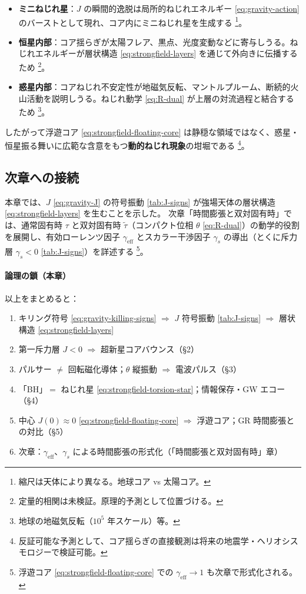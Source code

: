 \documentclass[dvipdfmx,a4paper,oneside]{jsbook}
\numberwithin{equation}{chapter}
\begin{document}
\begin{itemize}[leftmargin=2em]
  \item \textbf{ミニねじれ星}：\(J\) の瞬間的逸脱は局所的ねじれエネルギー \eqref{eq:gravity-action} のバーストとして現れ、コア内にミニねじれ星を生成する \footnote{縮尺は天体により異なる。地球コア vs 太陽コア。}。
  \item \textbf{恒星内部}：コア揺らぎが太陽フレア、黒点、光度変動などに寄与しうる。ねじれエネルギーが層状構造 \eqref{eq:strongfield-layers} を通じて外向きに伝播するため \footnote{定量的相関は未検証。原理的予測として位置づける。}。
  \item \textbf{惑星内部}：コアねじれ不安定性が地磁気反転、マントルプルーム、断続的火山活動を説明しうる。ねじれ動学 \eqref{eq:R-dual} が上層の対流過程と結合するため \footnote{地球の地磁気反転（\(10^5\) 年スケール）等。}。
\end{itemize}

したがって浮遊コア \eqref{eq:strongfield-floating-core} は静穏な領域ではなく、惑星・恒星振る舞いに広範な含意をもつ\textbf{動的ねじれ現象}の坩堀である \footnote{反証可能な予測として、コア揺らぎの直接観測は将来の地震学・ヘリオシスモロジーで検証可能。}。

\subsection{次章への接続}

本章では、\(J\) \eqref{eq:gravity-J} の符号振動 \eqref{tab:J-signs} が強場天体の層状構造 \eqref{eq:strongfield-layers} を生むことを示した。
次章「時間膨張と双対固有時」では、通常固有時 \(\tau\) と双対固有時 \(\tilde{\tau}\)（コンパクト位相 \(\theta\) \eqref{eq:R-dual}）の動学的役割を展開し、有効ローレンツ因子 \(\gamma_{\mathrm{eff}}\) とスカラー干渉因子 \(\gamma_s\) の導出（とくに斥力層 \(\gamma_s < 0\) \eqref{tab:J-signs}）を詳述する \footnote{浮遊コア \eqref{eq:strongfield-floating-core} での \(\gamma_{\mathrm{eff}} \to 1\) も次章で形式化される。}。

\paragraph{論理の鎖（本章）}
以上をまとめると：
\begin{enumerate}[leftmargin=2em]
  \item キリング符号 \eqref{eq:gravity-killing-signs} \(\Rightarrow\) \(J\) 符号振動 \eqref{tab:J-signs} \(\Rightarrow\) 層状構造 \eqref{eq:strongfield-layers}
  \item 第一斥力層 \(J < 0\) \(\Rightarrow\) 超新星コアバウンス（§2）
  \item パルサー \(\neq\) 回転磁化導体；\(\theta\) 縦振動 \(\Rightarrow\) 電波パルス（§3）
  \item 「BH」\(=\) ねじれ星 \eqref{eq:strongfield-torsion-star}；情報保存・GW エコー（§4）
  \item 中心 \(J(0) \approx 0\) \eqref{eq:strongfield-floating-core} \(\Rightarrow\) 浮遊コア；GR 時間膨張との対比（§5）
  \item 次章：\(\gamma_{\mathrm{eff}}\)、\(\gamma_s\) による時間膨張の形式化（「時間膨張と双対固有時」章）
\end{enumerate}
\end{document}
